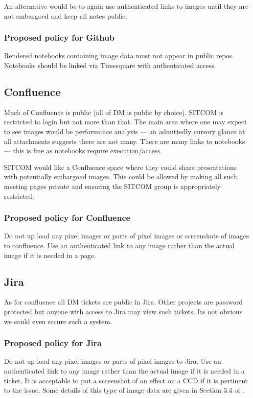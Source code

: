 An alternative would be to again use authenticated links to images until they are not embargoed and keep all notes public.

\subsubsection{Proposed policy for Github}
Rendered notebooks containing image data must not appear in public repos.
Notebooks should be linked via Timesquare with authenticated access.

\subsection{Confluence}
Much of Confluence is public (all of DM is public by choice).
SITCOM is restricted to login but not more than that.
The main area where one may expect to see images would be performance analysis --- an admittedly cursory glance at all attachments suggests there are not many.
There are many links to notebooks --- this is fine as notebooks require execution/access.

SITCOM would like a Confluence space where they could share presentations with potentially embargoed images.
This could be allowed by making all such meeting pages private and ensuring the SITCOM group is appropriately restricted.

\subsubsection{Proposed policy for Confluence}
Do not up load any pixel images or parts of pixel images or screenshots of images to confluence.
Use an authenticated link to any image rather than the actual image if it is needed in a page.

\subsection{Jira}
As for confluence all DM tickets are public in Jira.
Other projects are password protected but anyone with access to Jira may view such tickets.
Its not obvious we could even secure such a system.

\subsubsection{Proposed policy for Jira}
Do not up load any pixel images or parts of pixel images to Jira.
Use an authenticated link to any image rather than the actual image if it is needed in a ticket.
It is acceptable to put a screenshot of an effect on a CCD if it is pertinent to the issue.
Some details of this type of image data are given in Section 3.4 of .

